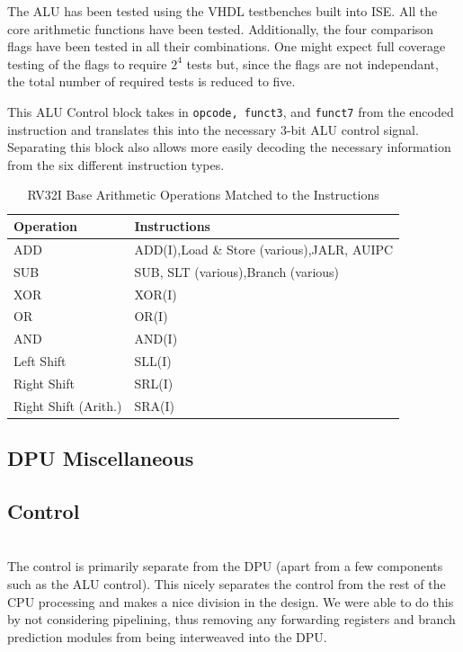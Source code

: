 \documentclass[lettersize,journal]{IEEEtran}
\begin{document}
The ALU has been tested using the VHDL testbenches built into ISE.
All the core arithmetic functions have been tested.
Additionally, the four comparison flags have been tested in all their combinations.
One might expect full coverage testing of the flags to require $2^{4}$ tests but, since the flags are not independant, the total number of required tests is reduced to five.

This ALU Control block takes in \verb|opcode, funct3|, and \verb|funct7| from the encoded instruction and translates this into the necessary 3-bit ALU control signal.
Separating this block also allows more easily decoding the necessary information from the six different \cite{riscvunprovisioned} instruction types.
\begin{table}
    \label{table:ALUOps}
    \centering
    \begin{tabular}{|p{2.7cm}|p{4cm}|}
        \hline
        Operation & Instructions \\
        \hline\hline
        ADD & ADD(I),\newline Load \& Store (various),\newline JALR, AUIPC\\
        SUB & SUB, SLT (various),\newline Branch (various)\\
        XOR & XOR(I)\\
        OR & OR(I)\\
        AND & AND(I)\\
        Left Shift & SLL(I)\\
        Right Shift & SRL(I)\\
        Right Shift (Arith.) & SRA(I)\\
        \hline
    \end{tabular}
    \caption{RV32I Base Arithmetic Operations Matched to the Instructions}
\end{table}


\subsection{DPU Miscellaneous}
\color{red}{TBD}\color{black}

\subsection{Control}
\color{red}{Incomplete...}\color{black}\\
The control is primarily separate from the DPU (apart from a few components such as the ALU control).
This nicely separates the control from the rest of the CPU processing and makes a nice division in the design.
We were able to do this by not considering pipelining, thus removing any forwarding registers and branch prediction modules from being interweaved into the DPU.
\end{document}

